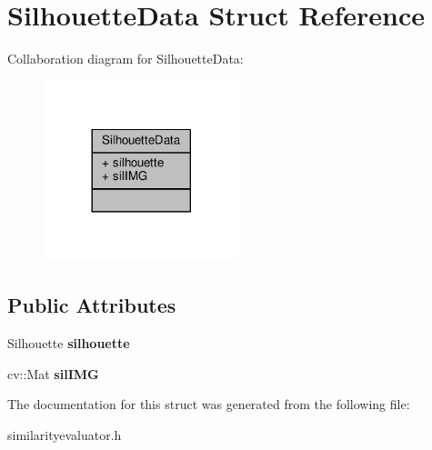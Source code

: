 \hypertarget{struct_silhouette_data}{}\section{Silhouette\+Data Struct Reference}
\label{struct_silhouette_data}


Collaboration diagram for Silhouette\+Data\+:\nopagebreak
\begin{figure}[H]
\begin{center}
\leavevmode
\includegraphics[width=161pt]{struct_silhouette_data__coll__graph}
\end{center}
\end{figure}
\subsection*{Public Attributes}
\begin{DoxyCompactItemize}
\item 
Silhouette {\bfseries silhouette}\hypertarget{struct_silhouette_data_a3d3e23a470900cc7833b7b9e07f1162b}{}\label{struct_silhouette_data_a3d3e23a470900cc7833b7b9e07f1162b}

\item 
cv\+::\+Mat {\bfseries sil\+I\+MG}\hypertarget{struct_silhouette_data_aa9b4629e5207c319e1cb56e2e3c89305}{}\label{struct_silhouette_data_aa9b4629e5207c319e1cb56e2e3c89305}

\end{DoxyCompactItemize}


The documentation for this struct was generated from the following file\+:\begin{DoxyCompactItemize}
\item 
similarityevaluator.\+h\end{DoxyCompactItemize}
